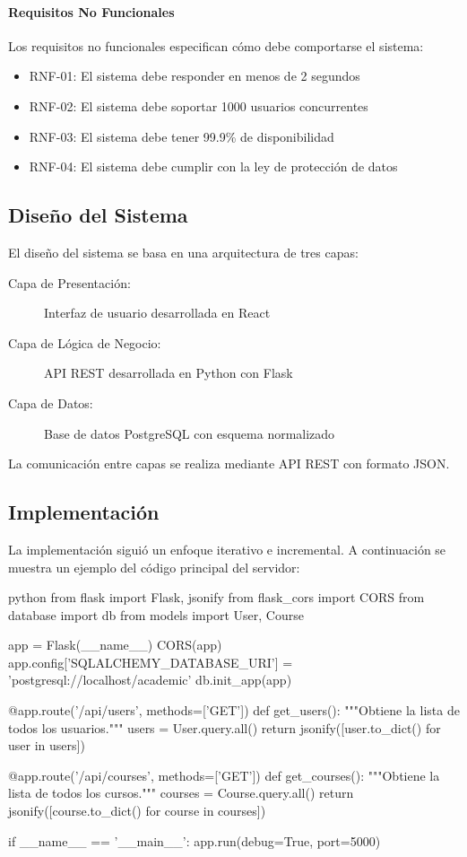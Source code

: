 \documentclass{pt-report}
\begin{document}
\paragraph{Requisitos No Funcionales}

Los requisitos no funcionales especifican cómo debe comportarse el sistema:

\begin{itemize}
    \item RNF-01: El sistema debe responder en menos de 2 segundos
    \item RNF-02: El sistema debe soportar 1000 usuarios concurrentes
    \item RNF-03: El sistema debe tener 99.9\% de disponibilidad
    \item RNF-04: El sistema debe cumplir con la ley de protección de datos
\end{itemize}

\subsection{Diseño del Sistema}

El diseño del sistema se basa en una arquitectura de tres capas:

\begin{description}
    \item[Capa de Presentación:] Interfaz de usuario desarrollada en React
    \item[Capa de Lógica de Negocio:] API REST desarrollada en Python con Flask
    \item[Capa de Datos:] Base de datos PostgreSQL con esquema normalizado
\end{description}

La comunicación entre capas se realiza mediante API REST con formato JSON.

\subsection{Implementación}

La implementación siguió un enfoque iterativo e incremental. A continuación
se muestra un ejemplo del código principal del servidor:

\begin{ptprintcode}{python}
from flask import Flask, jsonify
from flask_cors import CORS
from database import db
from models import User, Course

app = Flask(__name__)
CORS(app)
app.config['SQLALCHEMY_DATABASE_URI'] = 'postgresql://localhost/academic'
db.init_app(app)

@app.route('/api/users', methods=['GET'])
def get_users():
    """Obtiene la lista de todos los usuarios."""
    users = User.query.all()
    return jsonify([user.to_dict() for user in users])

@app.route('/api/courses', methods=['GET'])
def get_courses():
    """Obtiene la lista de todos los cursos."""
    courses = Course.query.all()
    return jsonify([course.to_dict() for course in courses])

if __name__ == '__main__':
    app.run(debug=True, port=5000)
\end{ptprintcode}
\end{document}
